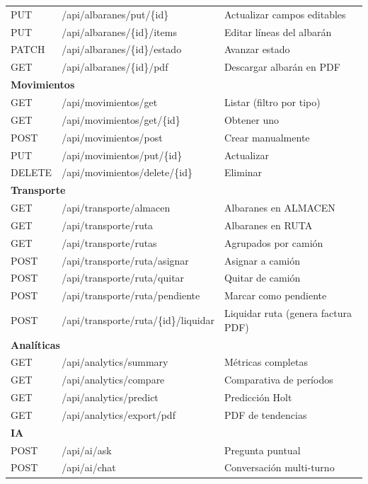 \documentclass[12pt,twoside,titlepage]{report}
\begin{document}
\begin{longtable}{llp{6cm}}
  PUT    & /api/albaranes/put/\{id\} & Actualizar campos editables \\
  PUT    & /api/albaranes/\{id\}/items & Editar líneas del albarán \\
  PATCH  & /api/albaranes/\{id\}/estado & Avanzar estado \\
  GET    & /api/albaranes/\{id\}/pdf & Descargar albarán en PDF \\
  \midrule
  \multicolumn{3}{l}{\textbf{Movimientos}} \\
  GET    & /api/movimientos/get  & Listar (filtro por tipo) \\
  GET    & /api/movimientos/get/\{id\} & Obtener uno \\
  POST   & /api/movimientos/post & Crear manualmente \\
  PUT    & /api/movimientos/put/\{id\} & Actualizar \\
  DELETE & /api/movimientos/delete/\{id\} & Eliminar \\
  \midrule
  \multicolumn{3}{l}{\textbf{Transporte}} \\
  GET    & /api/transporte/almacen & Albaranes en ALMACEN \\
  GET    & /api/transporte/ruta  & Albaranes en RUTA \\
  GET    & /api/transporte/rutas & Agrupados por camión \\
  POST   & /api/transporte/ruta/asignar & Asignar a camión \\
  POST   & /api/transporte/ruta/quitar  & Quitar de camión \\
  POST   & /api/transporte/ruta/pendiente & Marcar como pendiente \\
  POST   & /api/transporte/ruta/\{id\}/liquidar & Liquidar ruta (genera factura PDF) \\
  \midrule
  \multicolumn{3}{l}{\textbf{Analíticas}} \\
  GET    & /api/analytics/summary  & Métricas completas \\
  GET    & /api/analytics/compare  & Comparativa de períodos \\
  GET    & /api/analytics/predict  & Predicción Holt \\
  GET    & /api/analytics/export/pdf & PDF de tendencias \\
  \midrule
  \multicolumn{3}{l}{\textbf{IA}} \\
  POST   & /api/ai/ask  & Pregunta puntual \\
  POST   & /api/ai/chat & Conversación multi-turno \\

\end{longtable}
\end{document}
